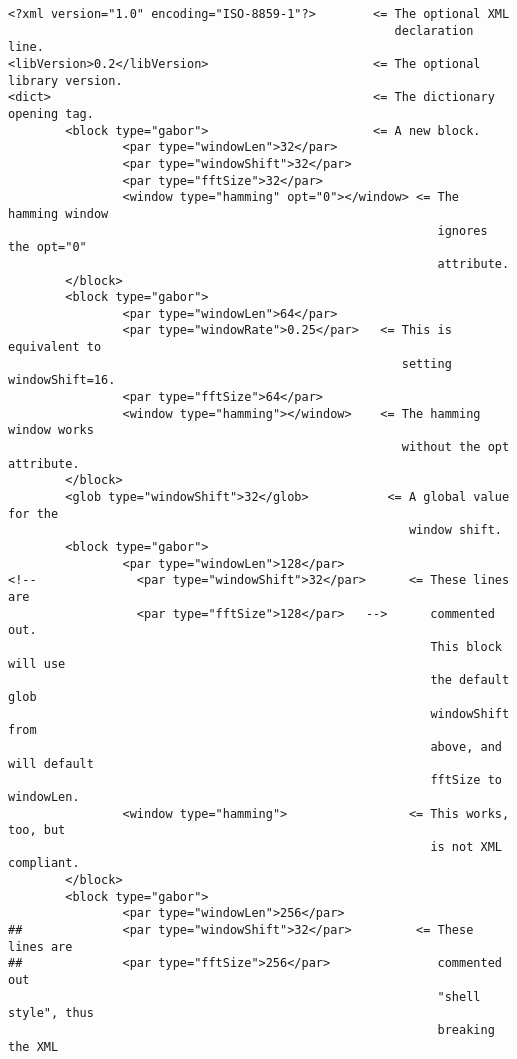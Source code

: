 \documentclass[11pt,a4paper]{article}
\begin{document}
\begin{verbatim}
<?xml version="1.0" encoding="ISO-8859-1"?>        <= The optional XML
                                                      declaration line.
<libVersion>0.2</libVersion>                       <= The optional library version.
<dict>                                             <= The dictionary opening tag.
        <block type="gabor">                       <= A new block.
                <par type="windowLen">32</par>
                <par type="windowShift">32</par>
                <par type="fftSize">32</par>
                <window type="hamming" opt="0"></window> <= The hamming window
                                                            ignores the opt="0"
                                                            attribute.
        </block>
        <block type="gabor">
                <par type="windowLen">64</par>
                <par type="windowRate">0.25</par>   <= This is equivalent to
                                                       setting windowShift=16.
                <par type="fftSize">64</par>
                <window type="hamming"></window>    <= The hamming window works
                                                       without the opt attribute.
        </block>
        <glob type="windowShift">32</glob>           <= A global value for the
                                                        window shift.
        <block type="gabor">
                <par type="windowLen">128</par>
<!--              <par type="windowShift">32</par>      <= These lines are
                  <par type="fftSize">128</par>   -->      commented out.
                                                           This block will use
                                                           the default glob
                                                           windowShift from
                                                           above, and will default
                                                           fftSize to windowLen.
                <window type="hamming">                 <= This works, too, but
                                                           is not XML compliant.
        </block>
        <block type="gabor">
                <par type="windowLen">256</par>
##              <par type="windowShift">32</par>         <= These lines are
##              <par type="fftSize">256</par>               commented out
                                                            "shell style", thus
                                                            breaking the XML

\end{verbatim}
\end{document}
